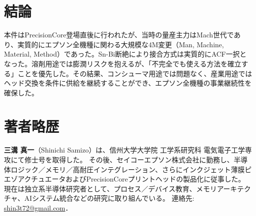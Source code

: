 \documentclass[conference]{IEEEtran}
\begin{document}
\section{結論}
本件はPrecisionCore登場直後に行われたが、当時の量産主力はMach世代であり、実質的にエプソン全機種に関わる大規模な4M変更（Man, Machine, Material, Method）であった。Sn-Bi断絶により接合方式は実質的にACF一択となった。溶剤用途では膨潤リスクを抱えるが、「不完全でも使える方法を確立する」ことを優先した。その結果、コンシューマ用途では問題なく、産業用途ではヘッド交換を条件に供給を継続することができ、エプソン全機種の事業継続性を確保した。

\section*{著者略歴}
\textbf{三溝 真一}（Shinichi Samizo）は、信州大学大学院 工学系研究科 電気電子工学専攻にて修士号を取得した。  
その後、セイコーエプソン株式会社に勤務し、半導体ロジック／メモリ／高耐圧インテグレーション、さらにインクジェット薄膜ピエゾアクチュエータおよびPrecisionCoreプリントヘッドの製品化に従事した。  
現在は独立系半導体研究者として、プロセス／デバイス教育、メモリアーキテクチャ、AIシステム統合などの研究に取り組んでいる。  
連絡先: \href{mailto:shin3t72@gmail.com}{shin3t72@gmail.com}．
\end{document}
